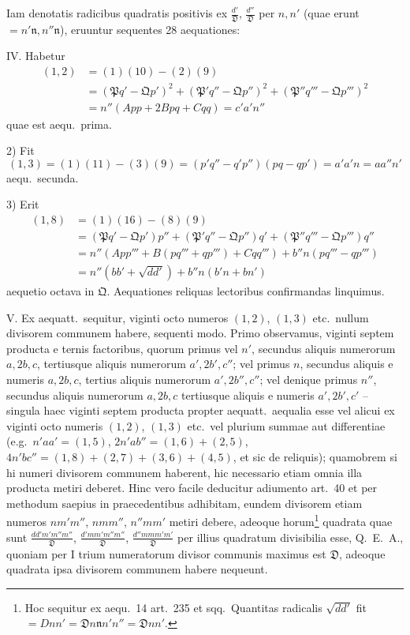 \documentclass[12pt,a4paper]{article}
\theoremstyle{plain}
\theoremstyle{definition}
\theoremstyle{remark}
\theoremstyle{problemstyle}
\begin{document}
Iam denotatis radicibus quadratis positivis ex $\tfrac{d'}{\mathfrak{D}}$, $\tfrac{d''}{\mathfrak{D}}$ per $n, n'$ (quae erunt $= n'\mathfrak{n}, n''\mathfrak{n}$), eruuntur sequentes 28 aequationes:

IV. Habetur
\begin{align*}
(1,2) &= (1)(10) - (2)(9) \\
&= (\mathfrak{P}q' - \mathfrak{Q}p')^2 + (\mathfrak{P}'q'' - \mathfrak{Q}p'')^2 + (\mathfrak{P}''q''' - \mathfrak{Q}p''')^2 \\
&= n''(App + 2Bpq + Cqq) = c'a'n''
\end{align*}
quae est aequ.\ prima.

2) Fit
\[
(1,3) = (1)(11) - (3)(9) = (p'q'' - q'p'')(pq - qp') = a'a'n = aa''n'
\]
aequ.\ secunda.

3) Erit
\begin{align*}
(1,8) &= (1)(16) - (8)(9) \\
&= (\mathfrak{P}q' - \mathfrak{Q}p')p'' + (\mathfrak{P}'q'' - \mathfrak{Q}p'')q' + (\mathfrak{P}''q''' - \mathfrak{Q}p''')q'' \\
&= n''(App''' + B(pq''' + qp''') + Cqq''') + b''n(pq''' - qp''') \\
&= n''(bb' + \sqrt{dd'}) + b''n(b'n + bn')
\end{align*}
aequetio octava in $\mathfrak{Q}$. Aequationes reliquas lectoribus confirmandas linquimus.

V. Ex aequatt.\ sequitur, viginti octo numeros $(1,2)$, $(1,3)$ etc.\ nullum divisorem communem habere, sequenti modo. Primo observamus, viginti septem producta e ternis factoribus, quorum primus vel $n'$, secundus aliquis numerorum $a, 2b, c$, tertiusque aliquis numerorum $a', 2b', c''$; vel primus $n$, secundus aliquis e numeris $a, 2b, c$, tertius aliquis numerorum $a', 2b'', c''$; vel denique primus $n''$, secundus aliquis numerorum $a, 2b, c$ tertiusque aliquis e numeris $a', 2b', c'$ -- singula haec viginti septem producta propter aequatt.\ aequalia esse vel alicui ex viginti octo numeris $(1,2)$, $(1,3)$ etc.\ vel plurium summae aut differentiae (e.g.\ $n'aa' = (1,5)$, $2n'ab'' = (1,6) + (2,5)$, $4n'bc'' = (1,8) + (2,7) + (3,6) + (4,5)$, et sic de reliquis); quamobrem si hi numeri divisorem communem haberent, hic necessario etiam omnia illa producta metiri deberet. Hinc vero facile deducitur adiumento art.\ 40 et per methodum saepius in praecedentibus adhibitam, eundem divisorem etiam numeros $nm'm''$, $nmm''$, $n''mm'$ metiri debere, adeoque horum\footnote{Hoc sequitur ex aequ.\ 14 art.\ 235 et sqq.\ Quantitas radicalis $\sqrt{dd'}$ fit $= Dnn' = \mathfrak{D}n\mathfrak{n}n'n'' = \mathfrak{D}nn'$.} quadrata quae sunt $\frac{dd'm'm''m''}{\mathfrak{D}}$, $\frac{d'mm'm''m''}{\mathfrak{D}}$, $\frac{d''mmm'm'}{\mathfrak{D}}$ per illius quadratum divisibilia esse, Q.\ E.\ A., quoniam per I trium numeratorum divisor communis maximus est $\mathfrak{D}$, adeoque quadrata ipsa divisorem communem habere nequeunt.
\end{document}
